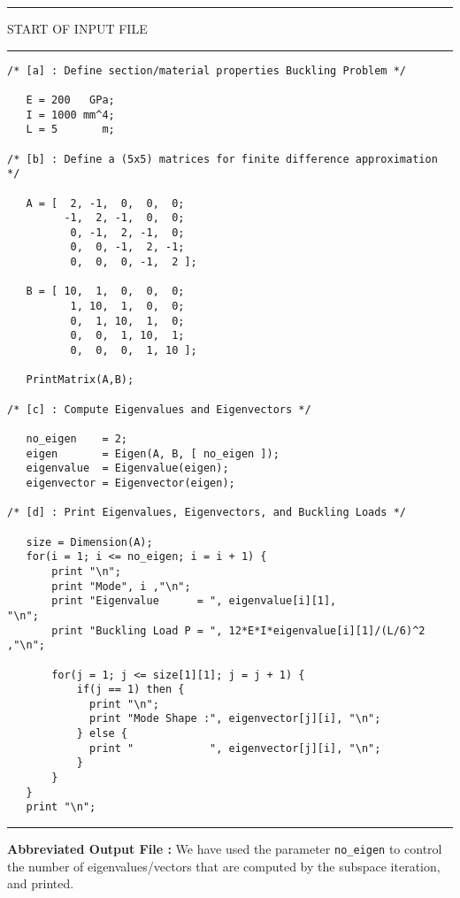 \vspace{0.15 in}
\begin{footnotesize}
\noindent
{\rule{2.3 in}{0.035 in} START OF INPUT FILE \rule{2.3 in}{0.035 in} }
\begin{verbatim}
/* [a] : Define section/material properties Buckling Problem */

   E = 200   GPa;
   I = 1000 mm^4;
   L = 5       m;

/* [b] : Define a (5x5) matrices for finite difference approximation */

   A = [  2, -1,  0,  0,  0;
         -1,  2, -1,  0,  0;
          0, -1,  2, -1,  0;
          0,  0, -1,  2, -1;
          0,  0,  0, -1,  2 ];

   B = [ 10,  1,  0,  0,  0;
          1, 10,  1,  0,  0;
          0,  1, 10,  1,  0;
          0,  0,  1, 10,  1;
          0,  0,  0,  1, 10 ];

   PrintMatrix(A,B);

/* [c] : Compute Eigenvalues and Eigenvectors */

   no_eigen    = 2;
   eigen       = Eigen(A, B, [ no_eigen ]);
   eigenvalue  = Eigenvalue(eigen);
   eigenvector = Eigenvector(eigen);

/* [d] : Print Eigenvalues, Eigenvectors, and Buckling Loads */

   size = Dimension(A);
   for(i = 1; i <= no_eigen; i = i + 1) {
       print "\n";
       print "Mode", i ,"\n";
       print "Eigenvalue      = ", eigenvalue[i][1],                "\n";
       print "Buckling Load P = ", 12*E*I*eigenvalue[i][1]/(L/6)^2 ,"\n";

       for(j = 1; j <= size[1][1]; j = j + 1) {
           if(j == 1) then {
             print "\n";
             print "Mode Shape :", eigenvector[j][i], "\n";
           } else {
             print "            ", eigenvector[j][i], "\n";
           } 
       }
   }
   print "\n";
\end{verbatim}
\rule{6.25 in}{0.035 in}
\end{footnotesize}

\vspace{0.15 in}\noindent
{\bf Abbreviated Output File :} 
We have used the parameter {\tt no\_eigen}
to control the number of eigenvalues/vectors that are 
computed by the subspace iteration, and printed.

